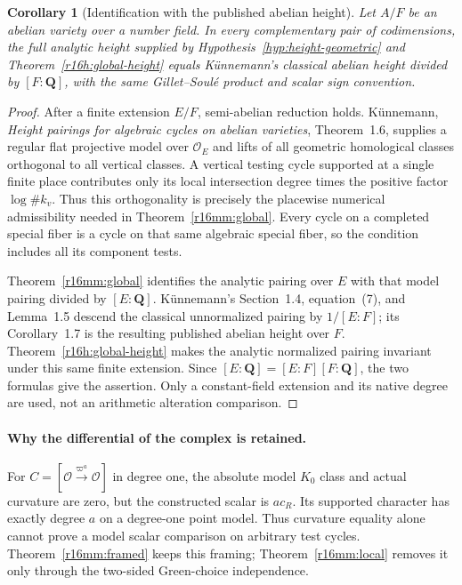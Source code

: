 \documentclass[11pt,a4paper]{article}
\newtheorem{corollary}[theorem]{Corollary}
\theoremstyle{definition}
\theoremstyle{remark}
\numberwithin{equation}{section}
\begin{document}
\begin{corollary}[Identification with the published abelian height]
\label{r16mm:abelian}
Let $A/F$ be an abelian variety over a number field. In every
complementary pair of codimensions, the full analytic height
supplied by Hypothesis~\ref{hyp:height-geometric} and
Theorem~\ref{r16h:global-height} equals K\"unnemann's classical
abelian height divided by $[F:\mathbf Q]$, with the same
Gillet--Soul\'e product and scalar sign convention.
\end{corollary}

\begin{proof}
After a finite extension $E/F$, semi-abelian reduction holds.
K\"unnemann, \emph{Height pairings for algebraic cycles on abelian
varieties}, Theorem~1.6, supplies a regular flat projective
model over $\mathcal O_E$ and lifts of all geometric homological
classes orthogonal to all vertical classes. A vertical testing
cycle supported at a single finite place contributes only its
local intersection degree times the positive factor
$\log\#k_v$. Thus this orthogonality is precisely the
placewise numerical admissibility needed in
Theorem~\ref{r16mm:global}. Every cycle on a completed special
fiber is a cycle on that same algebraic special fiber, so the
condition includes all its component tests.

Theorem~\ref{r16mm:global} identifies the analytic pairing over
$E$ with that model pairing divided by $[E:\mathbf Q]$.
K\"unnemann's Section~1.4, equation~(7), and Lemma~1.5 descend
the classical unnormalized pairing by $1/[E:F]$; its Corollary~1.7
is the resulting published abelian height over $F$.
Theorem~\ref{r16h:global-height} makes the analytic normalized
pairing invariant under this same finite extension. Since
$[E:\mathbf Q]=[E:F][F:\mathbf Q]$, the two formulas give the
assertion. Only a constant-field extension and its native degree
are used, not an arithmetic alteration comparison.
\end{proof}

\paragraph{Why the differential of the complex is retained.}
For $C=[\mathcal O\xrightarrow{\varpi^a}\mathcal O]$ in degree
one, the absolute model $K_0$ class and actual curvature are
zero, but the constructed scalar is $a c_R$. Its supported
character has exactly degree $a$ on a degree-one point model.
Thus curvature equality alone cannot prove a model scalar
comparison on arbitrary test cycles. Theorem~\ref{r16mm:framed}
keeps this framing; Theorem~\ref{r16mm:local} removes it only
through the two-sided Green-choice independence.
\end{document}
